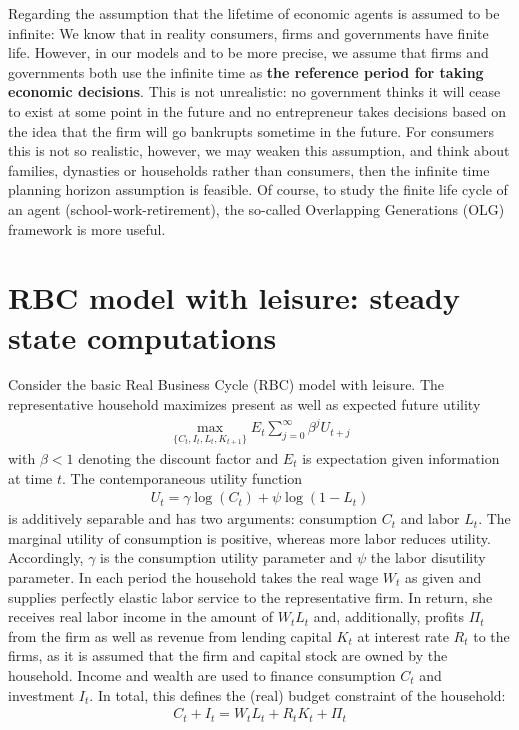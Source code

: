 \documentclass[a4paper]{scrartcl}
\begin{document}
\begin{enumerate}
\begin{solution}
                  Regarding the assumption that the lifetime of economic agents is assumed to be infinite: We know that in reality consumers, firms and governments have finite life. However, in our models and to be more precise, we assume that firms and governments both use the infinite time as \textbf{the reference period for taking economic decisions}. This is not unrealistic: no government thinks it will cease to exist at some point in the future and no entrepreneur takes decisions based on the idea that the firm will go bankrupts sometime in the future. For consumers this is not so realistic, however, we may weaken this assumption, and think about families, dynasties or households rather than consumers, then the infinite time planning horizon assumption is feasible. Of course, to study the finite life cycle of an agent (school-work-retirement), the so-called Overlapping Generations (OLG) framework is more useful.
              \end{solution}
    \end{enumerate}
    \newpage
    
    
    \section{RBC model with leisure: steady state computations}
    Consider the basic Real Business Cycle (RBC) model with leisure. The representative household maximizes present as well as expected future utility
    \begin{align*}
        \underset{\{C_{t},I_{t},L_t,K_{t+1}\}}{\max} E_t \sum_{j=0}^{\infty} \beta^{j} U_{t+j}
    \end{align*}
    with $\beta <1$ denoting the discount factor and $E_t$ is expectation given information at time $t$. The contemporaneous utility function 
    \begin{align*}
        U_t = \gamma \log(C_t) + \psi \log{(1-L_t)}
    \end{align*}
    is additively separable and has two arguments: consumption $C_t$ and labor $L_t$. The marginal utility of consumption is positive, whereas more labor reduces utility. Accordingly, $\gamma$ is the consumption utility parameter and $\psi$ the labor disutility parameter. In each period the household takes the real wage $W_t$ as given and supplies perfectly elastic labor service to the representative firm. In return, she receives real labor income in the amount of $W_t L_t$ and, additionally, profits $\Pi_t$ from the firm as well as revenue from lending capital $K_t$ at interest rate $R_t$ to the firms, as it is assumed that the firm and capital stock are owned by the household. Income and wealth are used to finance consumption $C_t$ and investment $I_t$. In total, this defines the (real) budget constraint of the household:
    \begin{align*}
        C_t + I_t = W_t L_t + R_t K_t + \Pi_t
    \end{align*}
    
\end{document}

